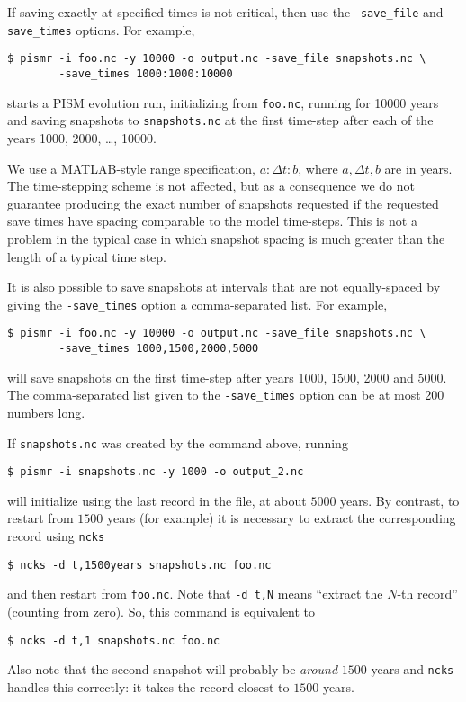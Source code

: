 If saving exactly at specified times is not critical, then use the \texttt{-save_file} and \texttt{-save_times} options.  For example,
\begin{verbatim}
$ pismr -i foo.nc -y 10000 -o output.nc -save_file snapshots.nc \
        -save_times 1000:1000:10000
\end{verbatim}
starts a PISM evolution run, initializing from \texttt{foo.nc}, running for
10000 years and saving snapshots to \texttt{snapshots.nc} at the first time-step
after each of the years 1000, 2000, \dots, 10000.

We use a MATLAB-style range specification, $a:\Delta t:b$, where $a,\Delta t,b$ are in years.  The time-stepping scheme is not affected, but as a consequence we do not guarantee producing the exact number of snapshots requested if the requested save times have spacing comparable to the model time-steps.  This is not a problem in the typical case in which snapshot spacing is much greater than the length of a typical time step.

It is also possible to save snapshots at intervals that are not equally-spaced
by giving the \texttt{-save_times} option a comma-separated list. For example,
\begin{verbatim}
$ pismr -i foo.nc -y 10000 -o output.nc -save_file snapshots.nc \
        -save_times 1000,1500,2000,5000
\end{verbatim}
will save snapshots on the first time-step after years 1000, 1500, 2000 and 5000.
The comma-separated list given to the \texttt{-save_times} option can be at most 200 numbers long.

If \texttt{snapshots.nc} was created by the command above, running
\begin{verbatim}
$ pismr -i snapshots.nc -y 1000 -o output_2.nc
\end{verbatim}
will initialize using the last record in the file, at about $5000$ years.  By contrast, to restart from $1500$ years (for example) it is necessary to extract the corresponding record using \texttt{ncks}
\begin{verbatim}
$ ncks -d t,1500years snapshots.nc foo.nc
\end{verbatim}
and then restart from \texttt{foo.nc}.  Note that \texttt{-d t,N} means ``extract the $N$-th record'' (counting from zero).  So, this command is equivalent to
\begin{verbatim}
$ ncks -d t,1 snapshots.nc foo.nc
\end{verbatim}
Also note that the second snapshot will probably be \emph{around} $1500$ years and \texttt{ncks} handles this correctly: it takes the record closest to $1500$ years.

